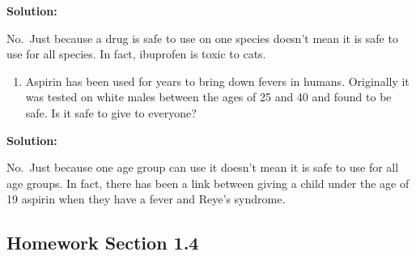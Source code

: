 \documentclass[
]{book}
\providecommand{\tightlist}{%
  \setlength{\itemsep}{0pt}\setlength{\parskip}{0pt}}
\begin{document}
\textbf{Solution:}

No.~Just because a drug is safe to use on one species doesn't mean it is safe to use for all species. In fact, ibuprofen is toxic to cats.

\begin{enumerate}
\def\labelenumi{\alph{enumi}.}
\setcounter{enumi}{1}
\tightlist
\item
  Aspirin has been used for years to bring down fevers in humans. Originally it was tested on white males between the ages of 25 and 40 and found to be safe. Is it safe to give to everyone?
\end{enumerate}

\textbf{Solution:}

No.~Just because one age group can use it doesn't mean it is safe to use for all age groups. In fact, there has been a link between giving a child under the age of 19 aspirin when they have a fever and Reye's syndrome.

\hypertarget{homework-section-1.4}{%
\subsection{Homework Section 1.4}\label{homework-section-1.4}}
\end{document}
